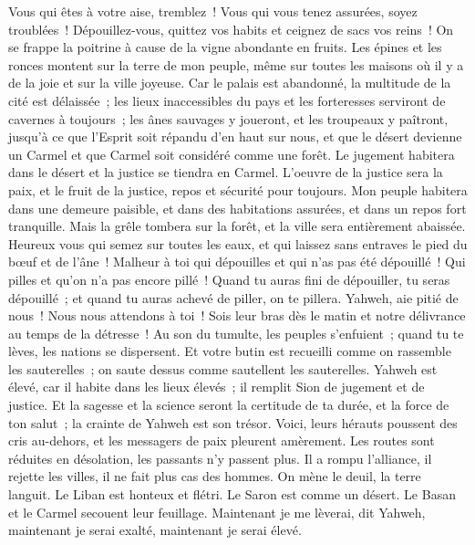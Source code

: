 \begin{multicols}{2}
Vous qui êtes à votre aise, tremblez~! Vous qui vous tenez assurées, soyez troublées~! Dépouillez-vous, quittez vos habits et ceignez de sacs vos reins~!
On se frappe la poitrine à cause de la vigne abondante en fruits.
Les épines et les ronces montent sur la terre de mon peuple, même sur toutes les maisons où il y a de la joie et sur la ville joyeuse.
Car le palais est abandonné, la multitude de la cité est délaissée~; les lieux inaccessibles du pays et les forteresses serviront de cavernes à toujours~; les ânes sauvages y joueront, et les troupeaux y paîtront,
jusqu'à ce que l'Esprit soit répandu d'en haut sur nous, et que le désert devienne un Carmel et que Carmel soit considéré comme une forêt.
Le jugement habitera dans le désert et la justice se tiendra en Carmel.
L'oeuvre de la justice sera la paix, et le fruit de la justice, repos et sécurité pour toujours.
Mon peuple habitera dans une demeure paisible, et dans des habitations assurées, et dans un repos fort tranquille.
Mais la grêle tombera sur la forêt, et la ville sera entièrement abaissée.
Heureux vous qui semez sur toutes les eaux, et qui laissez sans entraves le pied du bœuf et de l'âne~!
\VerseOne{}Malheur à toi qui dépouilles et qui n'as pas été dépouillé~! Qui pilles et qu'on n'a pas encore pillé~! Quand tu auras fini de dépouiller, tu seras dépouillé~; et quand tu auras achevé de piller, on te pillera.
Yahweh, aie pitié de nous~! Nous nous attendons à toi~! Sois leur bras dès le matin et notre délivrance au temps de la détresse~!
Au son du tumulte, les peuples s'enfuient~; quand tu te lèves, les nations se dispersent.
Et votre butin est recueilli comme on rassemble les sauterelles~; on saute dessus comme sautellent les sauterelles.
Yahweh est élevé, car il habite dans les lieux élevés~; il remplit Sion de jugement et de justice.
Et la sagesse et la science seront la certitude de ta durée, et la force de ton salut~; la crainte de Yahweh est son trésor.
Voici, leurs hérauts poussent des cris au-dehors, et les messagers de paix pleurent amèrement.
Les routes sont réduites en désolation, les passants n'y passent plus. Il a rompu l'alliance, il rejette les villes, il ne fait plus cas des hommes.
On mène le deuil, la terre languit. Le Liban est honteux et flétri. Le Saron est comme un désert. Le Basan et le Carmel secouent leur feuillage.
Maintenant je me lèverai, dit Yahweh, maintenant je serai exalté, maintenant je serai élevé.

\end{multicols}
